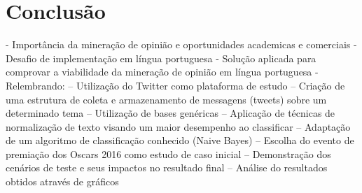 \chapter{Conclusão} \label{cap:conclusao}

- Importância da mineração de opinião e oportunidades academicas e comerciais
- Desafio de implementação em língua portuguesa
- Solução aplicada para comprovar a viabilidade da mineração de opinião em língua portuguesa
- Relembrando:
-- Utilização do Twitter como plataforma de estudo
-- Criação de uma estrutura de coleta e armazenamento de messagens (tweets) sobre um determinado tema
-- Utilização de bases genéricas
-- Aplicação de técnicas de normalização de texto visando um maior desempenho ao classificar
-- Adaptação de um algoritmo de classificação conhecido (Naive Bayes)
-- Escolha do evento de premiação dos Oscars 2016 como estudo de caso inicial
-- Demonstração dos cenários de teste e seus impactos no resultado final
-- Análise do resultados obtidos através de gráficos 




